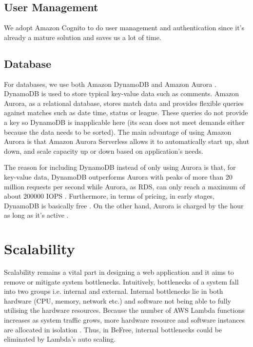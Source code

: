 \documentclass[conference]{IEEEtran}
\begin{document}
\subsection{User Management}
We adopt Amazon Cognito \cite{b8} to do user management and authentication since it's already a mature solution and saves us a lot of time.

\subsection{Database}
For databases, we use both Amazon DynamoDB \cite{b9} and Amazon Aurora \cite{b10}. DynamoDB is used to store typical key-value data such as comments. Amazon Aurora, as a relational database, stores match data and provides flexible queries against matches such as date time, status or league. These queries do not provide a key so DynamoDB is inapplicable here (its scan does not meet demands either because the data needs to be sorted). The main advantage of using Amazon Aurora is that Amazon Aurora Serverless \cite{b11} allows it to automatically start up, shut down, and scale capacity up or down based on application's needs.

The reason for including DynamoDB instead of only using Aurora is that, for key-value data, DynamoDB outperforms Aurora with peaks of more than 20 million requests per second \cite{b9} while Aurora, as RDS, can only reach a maximum of about 200000 IOPS \cite{b12} \cite{b13}. Furthermore, in terms of pricing, in early stages, DynamoDB is basically free \cite{b14}. On the other hand, Aurora is charged by the hour as long as it's active \cite{b15}.

\section{Scalability}
Scalability remains a vital part in designing a web application and it aims to remove or mitigate system bottlenecks. Intuitively, bottlenecks of a system fall into two groups i.e. internal and external. Internal bottlenecks lie in both hardware (CPU, memory, network etc.) and software not being able to fully utilising the hardware resources. Because the number of AWS Lambda functions increases as system traffic grows, more hardware resource and software instances are allocated in isolation \cite{b14}. Thus, in BeFree, internal bottlenecks could be eliminated by Lambda's auto scaling.
\end{document}
